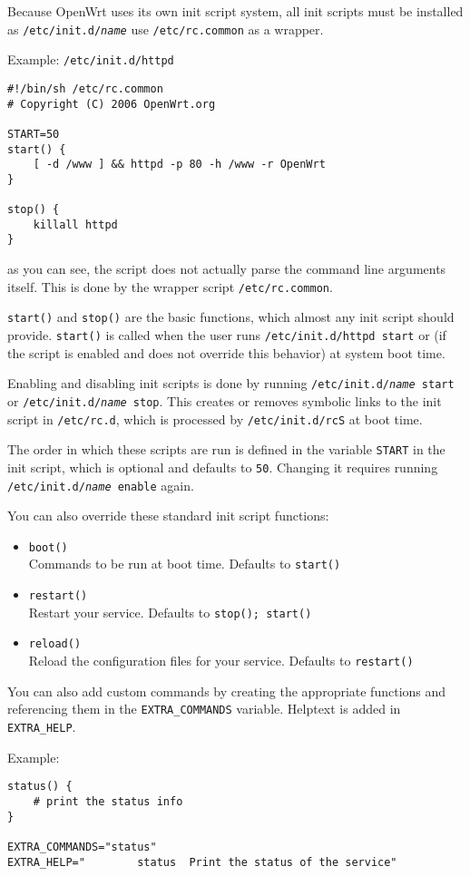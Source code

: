 Because OpenWrt uses its own init script system, all init scripts must be installed
as \texttt{/etc/init.d/\textit{name}} use \texttt{/etc/rc.common} as a wrapper.

Example: \texttt{/etc/init.d/httpd}

\begin{Verbatim}
#!/bin/sh /etc/rc.common
# Copyright (C) 2006 OpenWrt.org

START=50
start() {
    [ -d /www ] && httpd -p 80 -h /www -r OpenWrt
}

stop() {
    killall httpd
}
\end{Verbatim}

as you can see, the script does not actually parse the command line arguments itself.
This is done by the wrapper script \texttt{/etc/rc.common}.

\texttt{start()} and \texttt{stop()} are the basic functions, which almost any init
script should provide. \texttt{start()} is called when the user runs \texttt{/etc/init.d/httpd start}
or (if the script is enabled and does not override this behavior) at system boot time.

Enabling and disabling init scripts is done by running \texttt{/etc/init.d/\textit{name} start} 
or \texttt{/etc/init.d/\textit{name} stop}. This creates or removes symbolic links to the
init script in \texttt{/etc/rc.d}, which is processed by \texttt{/etc/init.d/rcS} at boot time.

The order in which these scripts are run is defined in the variable \texttt{START} in the init
script, which is optional and defaults to \texttt{50}. Changing it requires running 
\texttt{/etc/init.d/\textit{name} enable} again.

You can also override these standard init script functions:
\begin{itemize}
	\item \texttt{boot()} \\
		Commands to be run at boot time. Defaults to \texttt{start()}
		
	\item \texttt{restart()} \\
		Restart your service. Defaults to \texttt{stop(); start()}
	
	\item \texttt{reload()} \\
		Reload the configuration files for your service. Defaults to \texttt{restart()}

\end{itemize}

You can also add custom commands by creating the appropriate functions and referencing them
in the \texttt{EXTRA\_COMMANDS} variable. Helptext is added in \texttt{EXTRA\_HELP}.

Example:

\begin{Verbatim}
status() {
    # print the status info
}

EXTRA_COMMANDS="status"
EXTRA_HELP="        status  Print the status of the service"
\end{Verbatim}

